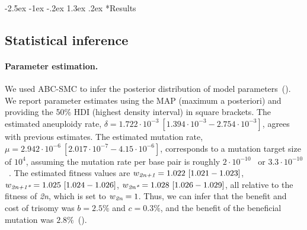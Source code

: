 \documentclass[12pt]{extarticle}
\makeatletter
\renewcommand\section{\@startsection {section}{1}{\z@}%
     {-2.5ex \@plus -1ex \@minus -.2ex}%
     {1.3ex \@plus.2ex}%
    {\Large\bfseries}}
\newcommand{\euwt}{\emph{2n}}
\newcommand{\anwt}{\emph{2n+1}}
\newcommand{\eumt}{\emph{2n*}}
\newcommand{\anmt}{\emph{2n+1*}}
\makeatother
\begin{document}
\section*{Results}

\subsection*{Statistical inference}

\paragraph{Parameter estimation.} 
We used ABC-SMC to infer the posterior distribution of model parameters~(). 
We report parameter estimates using the MAP (maximum a posteriori) and providing the 50\% HDI (highest density interval) in square brackets.
The estimated aneuploidy rate, $\delta=1.722\cdot10^{-3}\ [1.394\cdot10^{-3}-2.754\cdot10^{-3}]$, agrees with previous estimates. %
The estimated mutation rate, $\mu=2.942\cdot10^{-6}\ [2.017\cdot10^{-7}-4.15\cdot10^{-6}]$, corresponds to a mutation target size of $10^{4}$, assuming the mutation rate per base pair is roughly $2\cdot10^{-10}$~\citep{Zhu2014} or $3.3\cdot10^{-10}$~\citep{Lynch2008}.
The estimated fitness values are $w_{\anwt}=1.022\ [1.021-1.023]$,
$w_{\anmt}=1.025\ [1.024-1.026]$,
$w_{\eumt}=1.028\ [1.026-1.029]$, all relative to the fitness of \euwt, which is set to $w_{\euwt}=1$. 
Thus, we can infer that the benefit and cost of trisomy was $b=2.5\%$ and $c=0.3\%$, and the benefit of the beneficial mutation was $2.8\%$~(). 
\end{document}
